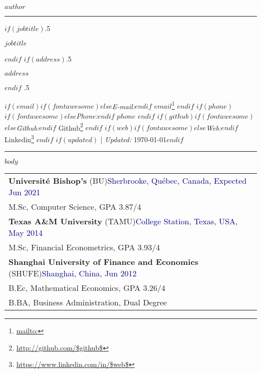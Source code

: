 \documentclass[$if(fontsize)$$fontsize$,$endif$$if(lang)$$babel-lang$,$endif$$if(papersize)$$papersize$paper,$endif$$for(classoption)$$classoption$$sep$,$endfor$]{$documentclass$}
\renewcommand{\href}[2]{#2\footnote{\url{#1}}}
\begin{document}
\centerline{\huge \bf $author$}

\vspace{2 mm}

\hrule

\vspace{2 mm}

$if(jobtitle)$\moveleft.5\hoffset\centerline{$jobtitle$}$endif$
$if(address)$\moveleft.5\hoffset\centerline{$address$}$endif$
\moveleft.5\hoffset\centerline{
$if(email)$$if(fontawesome)$\faEnvelopeO \hspace{1 mm}$else$\emph{E-mail:}$endif$ \href{mailto:}{$email$} \hspace{1 mm}$endif$ $if(phone)$$if(fontawesome)$\faPhone \hspace{1 mm}$else$\emph{Phone:}$endif$  $phone$  \hspace{1 mm} $endif$ $if(github)$$if(fontawesome)$\faGithub \hspace{1 mm}$else$\emph{Github:}$endif$ \href{http://github.com/$github$}{Github} \hspace{1 mm} $endif$ $if(web)$$if(fontawesome)$\faGlobe \hspace{1 mm}$else$\emph{Web:}$endif$ \href{https://www.linkedin.com/in/$web$}{Linkedin}  $endif$
$if(updated)$ | \emph{Updated:} \today$endif$}

\vspace{2 mm}

\hrule


$body$  %



\begin{tabular}{p{19.4cm}}
    \rule{0pt}{2mm} \textbf{Université Bishop's} \small(BU)\normalsize \hfill \textcolor{Navy}{Sherbrooke, Québec, Canada, Expected Jun 2021}\\
    \rule{0pt}{4mm} \hspace{6mm} M.Sc, Computer Science, GPA 3.87/4\\
    \rule{0pt}{4mm} \textbf{Texas A\&M University} \small(TAMU)\normalsize \hfill \textcolor{Navy}{College Station, Texas, USA, May 2014}\\
    \rule{0pt}{4mm} \hspace{6mm} M.Sc, Financial Econometrics, GPA 3.93/4\\
    \rule{0pt}{4mm} \textbf{Shanghai University of Finance and Economics} \small(SHUFE)\normalsize \hfill \textcolor{Navy}{Shanghai, China, Jun 2012}\\
    \rule{0pt}{4mm} \hspace{6mm} B.Ec, Mathematical Economics, GPA 3.26/4\\
    \rule{0pt}{4mm} \hspace{6mm} B.BA, Business Administration, Dual Degree\\
\end{tabular}
\end{document}
